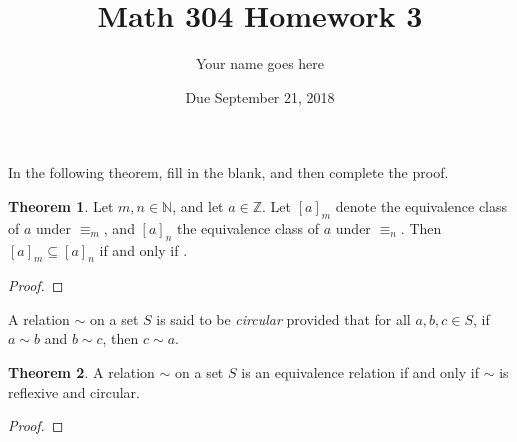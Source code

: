 \documentclass[11pt]{article}		%
\title{Math 304 Homework 3}
\author{Your name goes here}
\date{Due September 21, 2018}
\def\Z{{\mathbb Z}}
\def\N{{\mathbb N}}
\theoremstyle{definition}
\newtheorem{theorem}{Theorem}
\begin{document}
\maketitle


In the following theorem, fill in the blank, and then complete the proof.

\begin{theorem}
	Let $m,n\in\N$, and let $a\in \Z$.
	Let $[a]_m$ denote the equivalence class of $a$ under $\equiv_m$, and $[a]_n$ the equivalence class of $a$ under $\equiv_n$.
	Then $[a]_m\subseteq [a]_n$ if and only if \makebox[0.75in]{\hrulefill}.
\end{theorem}

\begin{proof}

\end{proof}


\medskip


A relation $\sim$ on a set $S$ is said to be \emph{circular} provided that for all $a,b,c\in S$, if $a\sim b$ and $b\sim c$, then $c\sim a$.

\begin{theorem}
	A relation $\sim$ on a set $S$ is an equivalence relation if and only if $\sim$ is reflexive and circular.
\end{theorem}

\begin{proof}
	
\end{proof}
\end{document}
